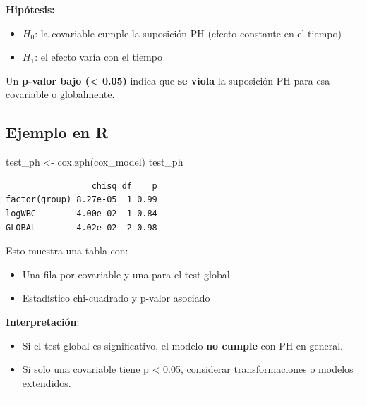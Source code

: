 \documentclass[
]{article}
\newenvironment{Shaded}{\begin{snugshade}}{\end{snugshade}}
\newcommand{\FunctionTok}[1]{\textcolor[rgb]{0.28,0.35,0.67}{#1}}
\newcommand{\NormalTok}[1]{\textcolor[rgb]{0.00,0.23,0.31}{#1}}
\newcommand{\OtherTok}[1]{\textcolor[rgb]{0.00,0.23,0.31}{#1}}
\providecommand{\tightlist}{%
  \setlength{\itemsep}{0pt}\setlength{\parskip}{0pt}}
\begin{document}
\textbf{Hipótesis:}

\begin{itemize}
\tightlist
\item
  \(H_0\): la covariable cumple la suposición PH (efecto constante en el
  tiempo)
\item
  \(H_1\): el efecto varía con el tiempo
\end{itemize}

Un \textbf{p-valor bajo (\textless{} 0.05)} indica que \textbf{se viola}
la suposición PH para esa covariable o globalmente.

\subsection{Ejemplo en R}\label{ejemplo-en-r}

\begin{Shaded}
\begin{Highlighting}[]
\NormalTok{test\_ph }\OtherTok{\textless{}{-}} \FunctionTok{cox.zph}\NormalTok{(cox\_model)}
\NormalTok{test\_ph}
\end{Highlighting}
\end{Shaded}

\begin{verbatim}
                 chisq df    p
factor(group) 8.27e-05  1 0.99
logWBC        4.00e-02  1 0.84
GLOBAL        4.02e-02  2 0.98
\end{verbatim}

Esto muestra una tabla con:

\begin{itemize}
\tightlist
\item
  Una fila por covariable y una para el test global
\item
  Estadístico chi-cuadrado y p-valor asociado
\end{itemize}

\textbf{Interpretación}:

\begin{itemize}
\tightlist
\item
  Si el test global es significativo, el modelo \textbf{no cumple} con
  PH en general.
\item
  Si solo una covariable tiene p \textless{} 0.05, considerar
  transformaciones o modelos extendidos.
\end{itemize}

\begin{center}\rule{0.5\linewidth}{0.5pt}\end{center}
\end{document}
